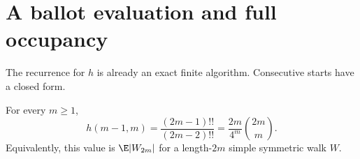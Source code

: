 \section{A ballot evaluation and full occupancy}\label{sec:ballot}

The recurrence for $h$ is already an exact finite algorithm.  Consecutive
starts have a closed form.

\begin{lemma}\label{lem:adjacent}
For every $m\geq1$,
\begin{equation}
 h(m-1,m)
 =\frac{(2m-1)!!}{(2m-2)!!}
 =\frac{2m}{4^m}\binom{2m}{m}.                         \label{eq:adjacent}
\end{equation}
Equivalently, this value is $\E|W_{2m}|$ for a length-$2m$ simple symmetric
walk $W$.
\end{lemma}

